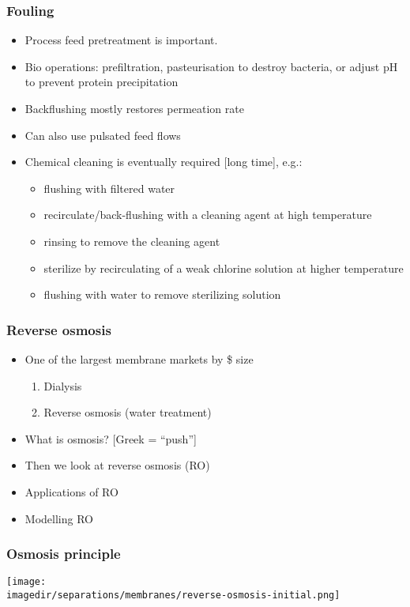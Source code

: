 \begin{frame}\frametitle{Fouling}
	\begin{itemize}
		\item	Process feed pretreatment is important. 
		\item	Bio operations: prefiltration, pasteurisation to destroy bacteria, or adjust pH to prevent protein precipitation
		\item	Backflushing mostly restores permeation rate
		\item	Can also use pulsated feed flows
		\item	Chemical cleaning is eventually required [long time], e.g.:
		\begin{itemize}
			\item	flushing with filtered water 
			\item	recirculate/back-flushing with a cleaning agent at high temperature
			\item	rinsing to remove the cleaning agent
			\item	sterilize by recirculating of a weak chlorine solution at higher temperature
			\item	flushing with water to remove sterilizing solution
		\end{itemize}
	\end{itemize}
\end{frame}

\begin{frame}\frametitle{Reverse osmosis}
	\begin{itemize}
		\item	One of the largest membrane markets by \$ size
			\begin{enumerate}
				\item	Dialysis
				\item	Reverse osmosis (water treatment)
			\end{enumerate}
		\item	What is osmosis? [Greek = ``push'']
		\item	Then we look at reverse osmosis (RO)
		\item	Applications of RO
		\item	Modelling RO
	\end{itemize}
\end{frame}

\begin{frame}\frametitle{Osmosis principle}
	\vfill
	\begin{center}
		\texttt{[image: \\imagedir/separations/membranes/reverse-osmosis-initial.png]}
	\end{center}
\end{frame}

